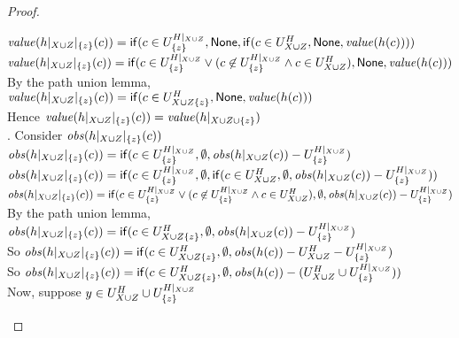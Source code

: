 \begin{proof}
\begin{tabbedproof}
\ooooo $\mathit{value}(h|_{X \cup Z}|_{\{{z}\}}(c)) = \mathsf{if}({c \in U^{H|_{X \cup Z}}_{\{{z}\}}}, {\mathsf{None}}, {\mathsf{if}({c \in U^H_{X \cup Z}}, {\mathsf{None}}, {\mathit{value}(h(c))})})$ \\
\ooooo $\mathit{value}(h|_{X \cup Z}|_{\{{z}\}}(c)) = \mathsf{if}({c \in U^{H|_{X \cup Z}}_{\{{z}\}} \vee (c \not\in U^{H|_{X \cup Z}}_{\{{z}\}} \land c \in U^H_{X \cup Z})}, {\mathsf{None}}, {\mathit{value}(h(c))})$ \\
\ooooo By the path union lemma, \\
\ooooox $\mathit{value}(h|_{X \cup Z}|_{\{{z}\}}(c)) = \mathsf{if}({c \in U^H_{X \cup Z \{{z}\}}}, {\mathsf{None}}, {\mathit{value}(h(c))})$ \\
\ooooo Hence $\mathit{value}(h|_{X \cup Z}|_{\{{z}\}}(c)) = \mathit{value}(h|_{X \cup Z \cup \{{z}\}})$ \\
. Consider $\mathit{obs}(h|_{X \cup Z}|_{\{{z}\}}(c))$ \\
\ooooo $\mathit{obs}(h|_{X \cup Z}|_{\{{z}\}}(c)) = \mathsf{if}({c \in U^{H|_{X \cup Z}}_{\{{z}\}}}, {\emptyset}, {\mathit{obs}(h|_{X \cup Z}(c)) - U^{H|_{X \cup Z}}_{\{{z}\}}})$ \\
\ooooo $\mathit{obs}(h|_{X \cup Z}|_{\{{z}\}}(c)) = \mathsf{if}({c \in U^{H|_{X \cup Z}}_{\{{z}\}}}, {\emptyset}, {\mathsf{if}({c \in U^H_{X \cup Z}}, {\emptyset}, {\mathit{obs}(h|_{X \cup Z}(c)) - U^{H|_{X \cup Z}}_{\{{z}\}}})})$ \\
\ooooo $\mathit{obs}(h|_{X \cup Z}|_{\{{z}\}}(c)) = \mathsf{if}({c \in U^{H|_{X \cup Z}}_{\{{z}\}} \vee (c \not\in U^{H|_{X \cup Z}}_{\{{z}\}} \land c \in U^H_{X \cup Z})}, {\emptyset}, {\mathit{obs}(h|_{X \cup Z}(c)) - U^{H|_{X \cup Z}}_{\{{z}\}}})$ \\
\ooooo By the path union lemma, \\
\ooooox $\mathit{obs}(h|_{X \cup Z}|_{\{{z}\}}(c)) = \mathsf{if}({c \in U^H_{X \cup Z \{{z}\}}}, {\emptyset}, {\mathit{obs}(h|_{X \cup Z}(c)) - U^{H|_{X \cup Z}}_{\{{z}\}}})$ \\
\ooooo So $\mathit{obs}(h|_{X \cup Z}|_{\{{z}\}}(c)) = \mathsf{if}({c \in U^H_{X \cup Z \{{z}\}}}, {\emptyset}, {\mathit{obs}(h(c)) - U^H_{X \cup Z} - U^{H|_{X \cup Z}}_{\{{z}\}}})$ \\
\ooooo So $\mathit{obs}(h|_{X \cup Z}|_{\{{z}\}}(c)) = \mathsf{if}({c \in U^H_{X \cup Z \{{z}\}}}, {\emptyset}, {\mathit{obs}(h(c)) - (U^H_{X \cup Z} \cup U^{H|_{X \cup Z}}_{\{{z}\}})})$ \\
\ooooo Now, suppose $y \in U^H_{X \cup Z} \cup U^{H|_{X \cup Z}}_{\{{z}\}}$ \\

\end{tabbedproof}
\end{proof}
